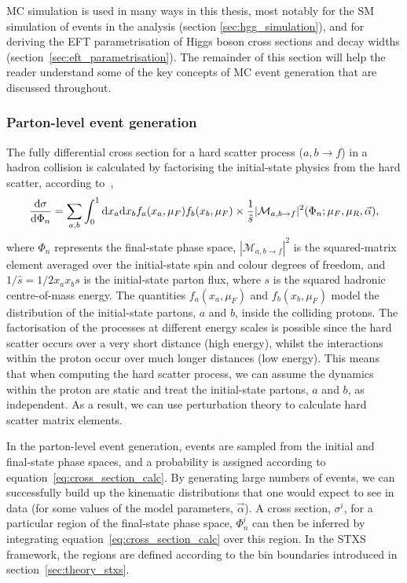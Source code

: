 MC simulation is used in many ways in this thesis, most notably for the SM simulation of events in the \Hgg analysis (section \ref{sec:hgg_simulation}), and for deriving the EFT parametrisation of Higgs boson cross sections and decay widths (section~\ref{sec:eft_parametrisation}). The remainder of this section will help the reader understand some of the key concepts of MC event generation that are discussed throughout.

\subsubsection{Parton-level event generation}
The fully differential cross section for a hard scatter process ($a,b \rightarrow f$) in a hadron collision is calculated by factorising the initial-state physics from the hard scatter, according to~\cite{ellis_stirling_webber_1996},
\begin{equation}\label{eq:cross_section_calc}
    \frac{{\rm{d}}\sigma}{{\rm{d}}\Phi_n} = \sum_{a,b} \int^1_0 {\rm{d}}x_a {\rm{d}}x_b f_a(x_a,\mu_F) f_b(x_b,\mu_F) \times \frac{1}{\hat{s}}|\mathcal{M}_{a,b\rightarrow f}|^2(\Phi_n;\mu_F,\mu_R,\vec{\alpha}),
\end{equation}
\noindent
where $\Phi_n$ represents the final-state phase space, $|\mathcal{M}_{a,b\rightarrow f}|^2$ is the squared-matrix element averaged over the initial-state spin and colour degrees of freedom, and $1/\hat{s}=1/2x_ax_bs$ is the initial-state parton flux, where $s$ is the squared hadronic centre-of-mass energy. The quantities $f_{a}(x_a,\mu_F)$ and $f_{b}(x_b,\mu_F)$ model the distribution of the initial-state partons, $a$ and $b$, inside the colliding protons. The factorisation of the processes at different energy scales is possible since the hard scatter occurs over a very short distance (high energy), whilst the interactions within the proton occur over much longer distances (low energy). This means that when computing the hard scatter process, we can assume the dynamics within the proton are static and treat the initial-state partons, $a$ and $b$, as independent. As a result, we can use perturbation theory to calculate hard scatter matrix elements.

In the parton-level event generation, events are sampled from the initial and final-state phase spaces, and a probability is assigned according to equation~\ref{eq:cross_section_calc}. By generating large numbers of events, we can successfully build up the kinematic distributions that one would expect to see in data (for some values of the model parameters, $\vec{\alpha}$). A cross section, $\sigma^i$, for a particular region of the final-state phase space, $\Phi^i_n$ can then be inferred by integrating equation~\ref{eq:cross_section_calc} over this region. In the STXS framework, the regions are defined according to the bin boundaries introduced in section~\ref{sec:theory_stxs}.

